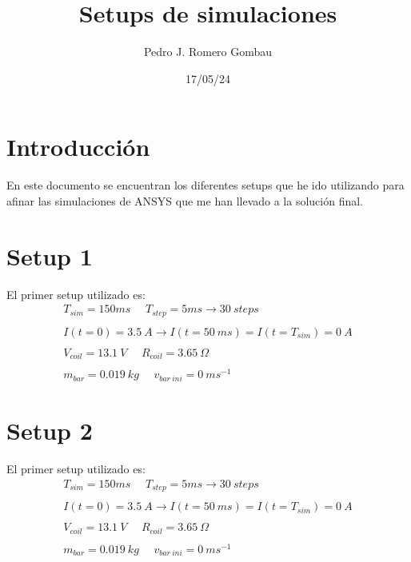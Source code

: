 \documentclass{article}
\title{Setups de simulaciones}
\author{Pedro J. Romero Gombau}
\date{17/05/24}
\begin{document}
\maketitle

\section{Introducción}
En este documento se encuentran los diferentes setups que he ido utilizando para afinar las simulaciones de ANSYS que me han llevado a la solución final.
\section{Setup 1}
El primer setup utilizado es:
\begin{align*}
    T_{sim}=150ms~~~~~~T_{step}=5ms\to30~steps
    \\~\\
    I(t=0)=3.5~A\to I(t=50~ms)=I(t=T_{sim})=0~A
    \\~\\
    V_{coil}=13.1~V~~~~~~R_{coil}=3.65~\Omega
    \\~\\
    m_{bar}=0.019~kg~~~~~~v_{bar~ini}=0~ms^{-1}
\end{align*}

\section{Setup 2}
El primer setup utilizado es:
\begin{align*}
    T_{sim}=150ms~~~~~~T_{step}=5ms\to30~steps
    \\~\\
    I(t=0)=3.5~A\to I(t=50~ms)=I(t=T_{sim})=0~A
    \\~\\
    V_{coil}=13.1~V~~~~~~R_{coil}=3.65~\Omega
    \\~\\
    m_{bar}=0.019~kg~~~~~~v_{bar~ini}=0~ms^{-1}
\end{align*}
\end{document}
